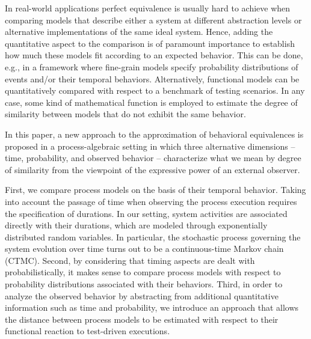 \documentclass[copyright,creativecommons]{eptcs}
\begin{document}
In real-world applications perfect equivalence is usually hard to achieve when comparing models that describe 
either a system at different abstraction levels or alternative implementations of the same ideal system. 
Hence, adding the quantitative aspect to the comparison is of paramount importance to establish how much these 
models fit according to an expected behavior. This can be done, e.g., in a framework where fine-grain models 
specify probability distributions of events and/or their temporal behaviors. Alternatively, functional models can 
be quantitatively compared with respect to a benchmark of testing scenarios. In any case, some kind of mathematical 
function is employed to estimate the degree of similarity between models that do not exhibit the same behavior.

In this paper, a new approach to the approximation of behavioral equivalences is proposed in a process-algebraic 
setting in which three alternative dimensions -- time, probability, and observed behavior -- characterize what 
we mean by degree of similarity from the viewpoint of the expressive power of an external observer. 

First, we compare process models on the basis of their temporal behavior. Taking into account the passage of time 
when observing the process execution requires the specification of durations. In our setting, system activities are 
associated directly with their durations, which are modeled through exponentially distributed random variables. 
In particular, the stochastic process governing the system evolution over time turns out to be a continuous-time 
Markov chain (CTMC). 
Second, by considering that timing aspects are dealt with probabilistically, it makes sense to compare process models 
with respect to probability distributions associated with their behaviors. 
Third, in order to analyze the observed behavior by abstracting from additional quantitative information such as
time and probability, we introduce an approach that allows the distance between process models to be estimated with 
respect to their functional reaction to test-driven executions.
\end{document}
